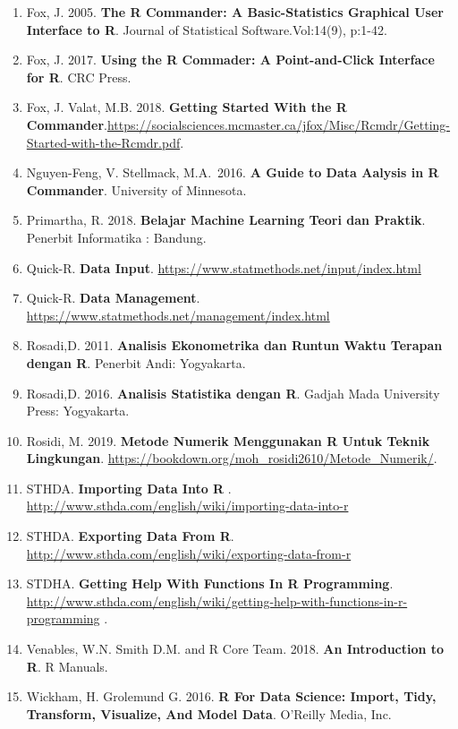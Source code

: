 \documentclass[12pt,]{krantz}
\providecommand{\tightlist}{%
  \setlength{\itemsep}{0pt}\setlength{\parskip}{0pt}}
\begin{document}
\begin{enumerate}
\def\labelenumi{\arabic{enumi}.}
\tightlist
\item
  Fox, J. 2005. \textbf{The R Commander: A Basic-Statistics Graphical User Interface to R}. Journal of Statistical Software.Vol:14(9), p:1-42.
\item
  Fox, J. 2017. \textbf{Using the R Commader: A Point-and-Click Interface for R}. CRC Press.
\item
  Fox, J. Valat, M.B. 2018. \textbf{Getting Started With the R Commander}.\url{https://socialsciences.mcmaster.ca/jfox/Misc/Rcmdr/Getting-Started-with-the-Rcmdr.pdf}.
\item
  Nguyen-Feng, V. Stellmack, M.A.~2016. \textbf{A Guide to Data Aalysis in R Commander}. University of Minnesota.
\item
  Primartha, R. 2018. \textbf{Belajar Machine Learning Teori dan Praktik}. Penerbit Informatika : Bandung.
\item
  Quick-R. \textbf{Data Input}. \url{https://www.statmethods.net/input/index.html}
\item
  Quick-R. \textbf{Data Management}. \url{https://www.statmethods.net/management/index.html}
\item
  Rosadi,D. 2011. \textbf{Analisis Ekonometrika dan Runtun Waktu Terapan dengan R}. Penerbit Andi: Yogyakarta.
\item
  Rosadi,D. 2016. \textbf{Analisis Statistika dengan R}. Gadjah Mada University Press: Yogyakarta.
\item
  Rosidi, M. 2019. \textbf{Metode Numerik Menggunakan R Untuk Teknik Lingkungan}. \url{https://bookdown.org/moh_rosidi2610/Metode_Numerik/}.
\item
  STHDA. \textbf{Importing Data Into R }. \url{http://www.sthda.com/english/wiki/importing-data-into-r}
\item
  STHDA. \textbf{Exporting Data From R}. \url{http://www.sthda.com/english/wiki/exporting-data-from-r}
\item
  STDHA. \textbf{Getting Help With Functions In R Programming}. \url{http://www.sthda.com/english/wiki/getting-help-with-functions-in-r-programming} .
\item
  Venables, W.N. Smith D.M. and R Core Team. 2018. \textbf{An Introduction to R}. R Manuals.
\item
  Wickham, H. Grolemund G. 2016. \textbf{R For Data Science: Import, Tidy, Transform, Visualize, And Model Data}. O'Reilly Media, Inc.
\end{enumerate}



\backmatter
\printindex
\end{document}

